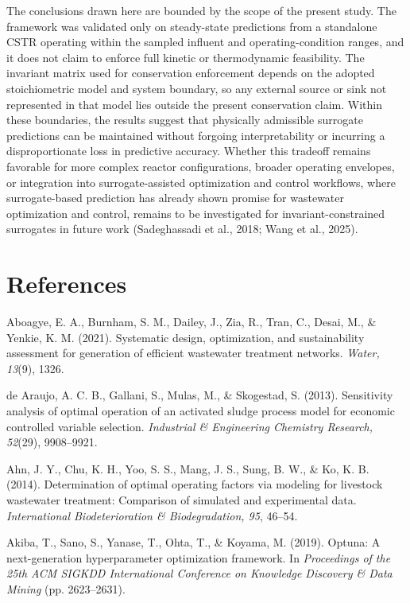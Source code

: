 \documentclass[a4paper,fleqn]{cas-sc}
\newenvironment{revblock}{\begingroup\color{revDefault}}{\endgroup}
\begin{document}
\begin{revblock}
The conclusions drawn here are bounded by the scope of the present study. The framework was validated only on steady-state predictions from a standalone CSTR operating within the sampled influent and operating-condition ranges, and it does not claim to enforce full kinetic or thermodynamic feasibility. The invariant matrix used for conservation enforcement depends on the adopted stoichiometric model and system boundary, so any external source or sink not represented in that model lies outside the present conservation claim. Within these boundaries, the results suggest that physically admissible surrogate predictions can be maintained without forgoing interpretability or incurring a disproportionate loss in predictive accuracy. Whether this tradeoff remains favorable for more complex reactor configurations, broader operating envelopes, or integration into surrogate-assisted optimization and control workflows, where surrogate-based prediction has already shown promise for wastewater optimization and control, remains to be investigated for invariant-constrained surrogates in future work (Sadeghassadi et al., 2018; Wang et al., 2025).
\end{revblock}

\section*{References}

\noindent Aboagye, E. A., Burnham, S. M., Dailey, J., Zia, R., Tran, C., Desai, M., \& Yenkie, K. M. (2021). Systematic design, optimization, and sustainability assessment for generation of efficient wastewater treatment networks. \textit{Water, 13}(9), 1326.

\noindent de Araujo, A. C. B., Gallani, S., Mulas, M., \& Skogestad, S. (2013). Sensitivity analysis of optimal operation of an activated sludge process model for economic controlled variable selection. \textit{Industrial \& Engineering Chemistry Research, 52}(29), 9908--9921.

\noindent Ahn, J. Y., Chu, K. H., Yoo, S. S., Mang, J. S., Sung, B. W., \& Ko, K. B. (2014). Determination of optimal operating factors via modeling for livestock wastewater treatment: Comparison of simulated and experimental data. \textit{International Biodeterioration \& Biodegradation, 95}, 46--54.

\noindent Akiba, T., Sano, S., Yanase, T., Ohta, T., \& Koyama, M. (2019). Optuna: A next-generation hyperparameter optimization framework. In \textit{Proceedings of the 25th ACM SIGKDD International Conference on Knowledge Discovery \& Data Mining} (pp. 2623--2631).
\end{document}

